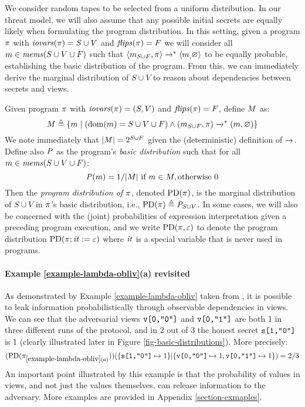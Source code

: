 We consider random tapes to be selected from a uniform distribution.
In our threat model, we will also assume that any possible initial
secrets are equally likely when formulating the program distribution.
In this setting, given a program $\pi$ with $\mathit{iovars}(\pi) = S \cup
V$ and $\mathit{flips}(\pi) = F$ we will consider all $m
\in \mathit{mems}(S \cup V \cup F)$ such that
$
\langle m_{S \cup F},\pi \rangle \xrightarrow{}^{*} \langle m_,\varnothing \rangle
$
to be equally probable, establishing the basic distribution of the
program. From this, we can immediately derive the marginal distribution
of $S \cup V$ to reason about dependencies between secrets and views. 
\begin{definition}
  \label{def-progd}
  \label{definition-progd}
  Given program $\pi$ with $\mathit{iovars}(\pi) = (S,V)$ and $\mathit{flips}(\pi) = F$, define $M$ as:
  $$
  M \triangleq \{ m \mid (\mathrm{dom}(m) = S \cup V \cup F) \wedge (m_{S \cup F},\pi) \xrightarrow{}^{*} (m,\varnothing) \}
  $$
  We note immediately that $|M| = 2^{S \cup F}$ given the (deterministic) definition of $\xrightarrow{}$. 
  Define also $\mathit{P}$ as the program's \emph{basic distribution} such that for all
  $m \in \mathit{mems}(S \cup V \cup F)$:
  $$
  \mathit{P}(m) =  1 / |M| \ \text{if}\ m \in M, \text{otherwise}\ 0
  $$
  Then the \emph{program distribution of $\pi$}, denoted $\mathrm{PD}(\pi)$, is the
  marginal distribution of $S \cup V$ in $\pi$'s basic distribution, i.e., 
  $
  \mathrm{PD}(\pi) \triangleq  {\mathit{P}}_{S\cup V}
  $.
  In some cases, we will also be concerned with the (joint)
  probabilities of expression interpretation given a preceding program
  execution, and we write $\mathrm{PD}(\pi, \varepsilon)$ to denote the program
  distribution $\mathrm{PD}(\pi;\mathit{it} := \varepsilon)$ where $\mathit{it}$ is a
  special variable that is never used in programs.
\end{definition}

\paragraph{Example \ref{example-lambda-obliv}(a) revisited} As demonstrated
by Example \ref{example-lambda-obliv} taken from \cite{darais2019language}, it is possible
to leak information probabilistically through observable dependencies
in views. We can see that the adversarial views $\texttt{v[0,"0"]}$ and $\texttt{v[0,"1"]}$
are both 1 in three different runs of the protocol, and in 2 out of 3
the honest secret $\texttt{s[1,"0"]}$ is 1 (clearly illustrated later in
Figure \ref{fig-basic-distributions}). More precisely:
$$
(\mathrm{PD}(\pi_{\ref{example-lambda-obliv}(a)}))(\{\texttt{s[1,"0"]} \mapsto 1 \}|\{ \texttt{v[0,"0"]} \mapsto 1, \texttt{v[0,"1"]} \mapsto 1 \}) = 2/3
$$ An important point illustrated by this example is that the
probability of values in views, and not just the values themselves,
can release information to the adversary.  More examples are provided
in Appendix \ref{section-exmaples}.

